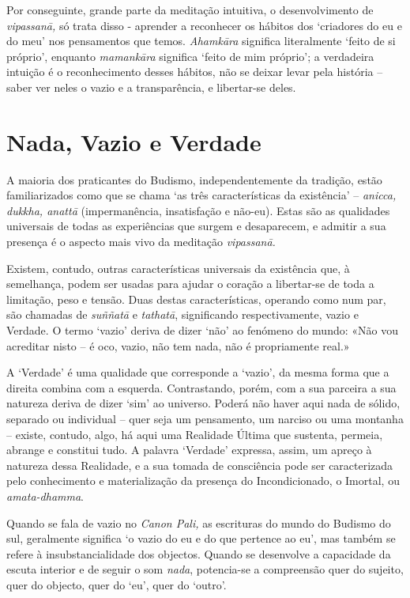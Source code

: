 Por conseguinte, grande parte da meditação intuitiva, o desenvolvimento
de \emph{vipassanā,} só trata disso - aprender a reconhecer os hábitos
dos `criadores do eu e do meu' nos pensamentos que temos.
\emph{Ahamkāra} significa literalmente `feito de si próprio', enquanto
\emph{mamankāra} significa `feito de mim próprio'; a verdadeira intuição
é o reconhecimento desses hábitos, não se deixar levar pela história --
saber ver neles o vazio e a transparência, e libertar-se deles.

\section{Nada, Vazio e Verdade}

A maioria dos praticantes do Budismo, independentemente da tradição,
estão familiarizados como que se chama `as três características da
existência' -- \emph{anicca, dukkha, anattā} (impermanência,
insatisfação e não-eu). Estas são as qualidades universais de todas as
experiências que surgem e desaparecem, e admitir a sua presença é o
aspecto mais vivo da meditação \emph{vipassanā.}

Existem, contudo, outras características universais da existência que, à
semelhança, podem ser usadas para ajudar o coração a libertar-se de toda
a limitação, peso e tensão. Duas destas características, operando como
num par, são chamadas de \emph{suññatā} e \emph{tathatā}, significando
respectivamente, vazio e Verdade. O termo `vazio' deriva de dizer `não'
ao fenómeno do mundo: «Não vou acreditar nisto -- é oco, vazio, não tem
nada, não é propriamente real.»

A `Verdade' é uma qualidade que corresponde a `vazio', da mesma forma
que a direita combina com a esquerda. Contrastando, porém, com a sua
parceira a sua natureza deriva de dizer `sim' ao universo. Poderá não
haver aqui nada de sólido, separado ou individual -- quer seja um
pensamento, um narciso ou uma montanha -- existe, contudo, algo, há aqui
uma Realidade Última que sustenta, permeia, abrange e constitui tudo. A
palavra `Verdade' expressa, assim, um apreço à natureza dessa Realidade,
e a sua tomada de consciência pode ser caracterizada pelo conhecimento e
materialização da presença do Incondicionado, o Imortal, ou
\emph{amata-dhamma}.

Quando se fala de vazio no \emph{Canon Pali,} as escrituras do mundo do
Budismo do sul, geralmente significa `o vazio do eu e do que pertence ao
eu', mas também se refere à insubstancialidade dos objectos. Quando se
desenvolve a capacidade da escuta interior e de seguir o som
\emph{nada}, potencia-se a compreensão quer do sujeito, quer do objecto,
quer do `eu', quer do `outro'.

